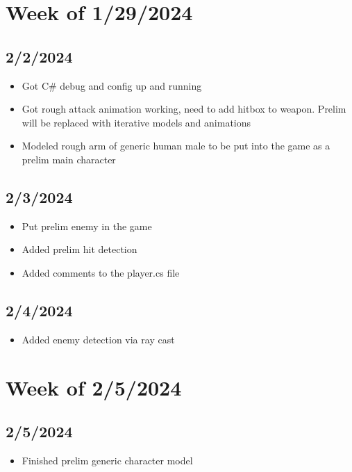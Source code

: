 \documentclass{article}
\begin{document}
\setlength{\voffset}{-0.75in}
\setlength{\headsep}{5pt}




\section*{Week of 1/29/2024}
\subsection*{2/2/2024}

\begin{itemize}
    \item Got C\# debug and config up and running
    \item Got rough attack animation working, need to add hitbox to weapon. Prelim will be replaced with iterative models and animations
    \item Modeled rough arm of generic human male to be put into the game as a prelim main character
\end{itemize}

\subsection*{2/3/2024}

\begin{itemize}
   \item Put prelim enemy in the game
   \item Added prelim hit detection
   \item Added comments to the player.cs file
\end{itemize}

\subsection*{2/4/2024}

\begin{itemize}
   \item Added enemy detection via ray cast
\end{itemize}

\section*{Week of 2/5/2024}
\subsection*{2/5/2024}

\begin{itemize}
   \item Finished prelim generic character model
\end{itemize}
\end{document}

